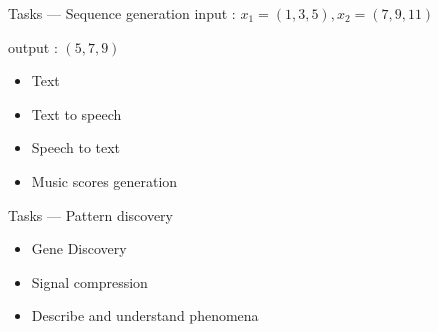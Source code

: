 \begin{frame}{Tasks --- Sequence generation}
  input : $x_1=(1,3,5),x_2=(7,9,11)$

  output : $(5,7,9)$

  \begin{itemize}
    \item Text
    \item Text to speech
    \item Speech to text
    \item Music scores generation
  \end{itemize}
\end{frame}

\begin{frame}{Tasks --- Pattern discovery}
  \begin{itemize}
    \item Gene Discovery
    \item Signal compression
    \item Describe and understand phenomena
  \end{itemize}
\end{frame}
